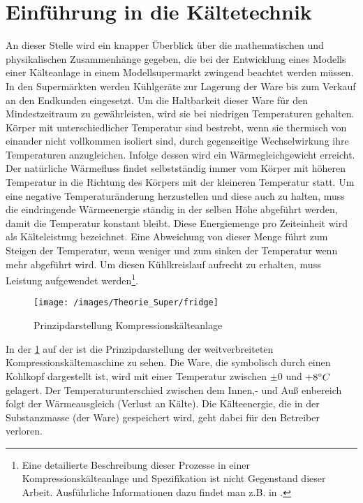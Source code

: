 
\section{Einf\"uhrung in die K\"altetechnik}

An dieser Stelle wird ein knapper \"Uberblick über die mathematischen und
physikalischen Zusammenhänge gegeben, die bei der Entwicklung eines Modells
einer K\"alteanlage in einem Modellsupermarkt zwingend beachtet werden müssen.\\

In den Superm\"arkten werden K\"uhlger\"ate zur Lagerung der Ware bis zum
Verkauf an den Endkunden eingesetzt. Um die Haltbarkeit dieser Ware f\"ur den
Mindestzeitraum zu gew\"ahrleisten, wird sie bei niedrigen Temperaturen
gehalten. Körper mit unterschiedlicher Temperatur sind bestrebt, wenn sie
thermisch von einander nicht vollkommen isoliert sind, durch gegenseitige
Wechselwirkung ihre Temperaturen anzugleichen. Infolge dessen wird ein
Wärmegleichgewicht erreicht. Der nat\"urliche W\"armefluss findet
selbstst\"andig immer vom K\"orper mit h\"oheren Temperatur in die Richtung des
K\"orpers mit der kleineren Temperatur statt. Um eine negative
Temperaturänderung herzustellen und diese auch zu halten, muss die eindringende
Wärmeenergie ständig in der selben Höhe abgeführt werden, damit die Temperatur
konstant bleibt. Diese Energiemenge pro Zeiteinheit wird als Kälteleistung
bezeichnet. Eine Abweichung von dieser Menge führt zum Steigen der Temperatur,
wenn weniger und zum sinken der Temperatur wenn mehr abgeführt wird. Um diesen
Kühlkreislauf aufrecht zu erhalten, muss Leistung aufgewendet werden\footnote{
	Eine detailierte Beschreibung dieser Prozesse in einer
	Kompressionskälteanlage und Spezifikation ist nicht Gegenstand dieser
	Arbeit.  Ausführliche Informationen dazu findet man z.B.  in \cite{caro,
	doctor, TAB_A1}.}.

\begin{figure}[h]
\begin{center}
\texttt{[image: /images/Theorie\_Super/fridge]}
\end{center}
\caption{Prinzipdarstellung Kompressionsk\"alteanlage}
\label{fig:prinz}
\end{figure}

In der \cref{fig:prinz} auf der \pageref{fig:prinz}ist die Prinzipdarstellung der weitverbreiteten
Kompressionsk\"altemaschine zu sehen. Die Ware, die symbolisch durch einen
Kohlkopf dargestellt ist, wird mit einer Temperatur zwischen $\pm 0$ und
$+8^\circ C$ gelagert. Der Temperaturunterschied zwischen dem Innen,- und Au\ss
enbereich folgt der W\"armeausgleich (Verlust an K\"alte). Die K\"alteenergie,
die in der Substanzmasse (der Ware) gespeichert wird, geht dabei f\"ur den
Betreiber verloren.

